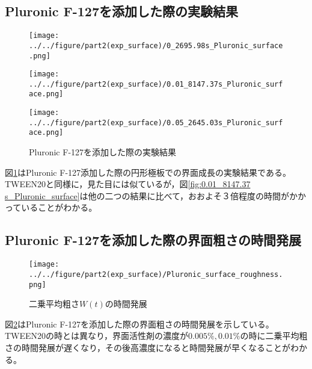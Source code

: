 \documentclass[autodetect-engine,dvi=dvipdfmx,a4paper,ja=standard,oneside,openany,11pt,draft]{bxjsbook}
\begin{document}
\subsection{Pluronic F-127を添加した際の実験結果}
\begin{figure}[H]
  \begin{minipage}
    {0.32\textwidth}
    \centering
    \texttt{[image: ../../figure/part2(exp\_surface)/0\_2695.98s\_Pluronic\_surface.png]}
    \label{fig:0_2695.98 s_Pluronic_surface}
  \end{minipage}
  \begin{minipage}
    {0.32\textwidth}
    \centering
    \texttt{[image: ../../figure/part2(exp\_surface)/0.01\_8147.37s\_Pluronic\_surface.png]}
    \label{fig:0.01_8147.37 s_Pluronic_surface}
  \end{minipage}
  \begin{minipage}
    {0.32\textwidth}
    \centering
    \texttt{[image: ../../figure/part2(exp\_surface)/0.05\_2645.03s\_Pluronic\_surface.png]}
    \label{fig:0.03_2695.98 s_Pluronic_surface}
  \end{minipage}
  \caption{Pluronic F-127を添加した際の実験結果}
  \label{fig:Pluronic_surface}
\end{figure}
図\ref{fig:Pluronic_surface}はPluronic F-127添加した際の円形極板での界面成長の実験結果である。TWEEN20と同様に，見た目には似ているが，図\ref{fig:0.01_8147.37 s_Pluronic_surface}は他の二つの結果に比べて，おおよそ３倍程度の時間がかかっていることがわかる。
\subsection{Pluronic F-127を添加した際の界面粗さの時間発展}
\begin{figure}[H]
  \centering
  \texttt{[image: ../../figure/part2(exp\_surface)/Pluronic\_surface\_roughness.png]}
  \caption{二乗平均粗さ$W(t)$の時間発展}
  \label{fig:surface_roughness_Pluronic}
\end{figure}
図\ref{fig:surface_roughness_Pluronic}はPluronic F-127を添加した際の界面粗さの時間発展を示している。TWEEN20の時とは異なり，界面活性剤の濃度が$0.005\%,0.01\%$の時に二乗平均粗さの時間発展が遅くなり，その後高濃度になると時間発展が早くなることがわかる。
\ifdraft{
  
  
}{}
\end{document}
